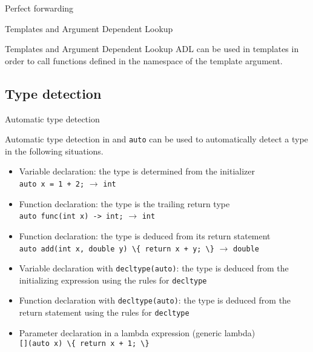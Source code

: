 \begin{frame}{Perfect forwarding}{}
  \begin{example}
  \end{example}
\end{frame}

\begin{frame}{Templates and Argument Dependent Lookup}{}
  \begin{block}{Templates and Argument Dependent Lookup}
    ADL can be used in templates in order to call functions defined in the namespace of the template argument.
  \end{block}
  \begin{example}
  \end{example}
\end{frame}



\subsection{Type detection}

\begin{frame}{Automatic type detection}{}
  \begin{block}{Automatic type detection in  and }
    \lstinline!auto! can be used to automatically detect a type in the following situations.
    \begin{itemize}
    \item
      Variable declaration: the type is determined from the initializer \\
      \lstinline!auto x = 1 + 2;! $\to$ \lstinline!int!
    \item
      Function declaration: the type is the trailing return type \\
      \lstinline!auto func(int x) -> int;! $\to$ \lstinline!int!
    \item
      Function declaration: the type is deduced from its return statement \\
      \lstinline!auto add(int x, double y) \{ return x + y; \}! $\to$ \lstinline!double!
    \item
      Variable declaration with \lstinline!decltype(auto)!: the type is deduced from the initializing expression using the rules for \lstinline!decltype!
    \item
      Function declaration with \lstinline!decltype(auto)!: the type is deduced from the return statement using the rules for \lstinline!decltype!
    \item
      Parameter declaration in a lambda expression (generic lambda) \\
      \lstinline![](auto x) \{ return x + 1; \}!
    \end{itemize}
  \end{block}
\end{frame}

